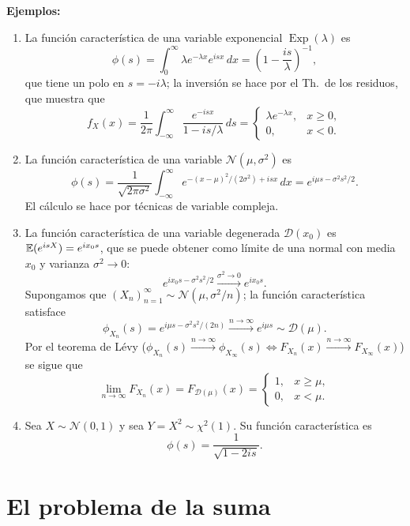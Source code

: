 \noindent \textbf{Ejemplos:}
\begin{enumerate}
  \item La función característica de una variable exponencial $\operatorname{Exp}(\lambda)$ es
        \[
          \phi(s) = \int_0^\infty \lambda e^{-\lambda x} e^{isx}\,dx = \left(1 - \frac{is}{\lambda}\right)^{-1},
        \]
        que tiene un polo en $s = -i\lambda$; la inversión se hace por el Th.\ de los residuos, que muestra que
        \[
          f_X(x) = \frac{1}{2\pi}\int_{-\infty}^\infty \frac{e^{-isx}}{1 - is/\lambda}\,ds =
          \begin{cases}
            \lambda e^{-\lambda x}, & x \ge 0, \\
            0, & x < 0.
          \end{cases}
        \]
  \item La función característica de una variable $\mathcal{N}(\mu, \sigma^2)$ es
        \[
          \phi(s) = \frac{1}{\sqrt{2\pi\sigma^2}}\int_{-\infty}^\infty e^{-(x-\mu)^2/(2\sigma^2) + isx}\,dx = e^{i\mu s - \sigma^2 s^2/2}.
        \]
        El cálculo se hace por técnicas de variable compleja.
  \item La función característica de una variable degenerada $\mathcal{D}(x_0)$ es $\mathbb{E}(e^{isX}) = e^{ix_0 s}$, que se puede obtener como límite de una normal con media $x_0$ y varianza $\sigma^2 \to 0$:
        \[
          e^{ix_0 s - \sigma^2 s^2/2} \xrightarrow{\sigma^2 \to 0} e^{ix_0 s}.
        \]
        Supongamos que $(X_n)_{n=1}^\infty \sim \mathcal{N}(\mu, \sigma^2/n)$; la función característica satisface
        \[
          \phi_{X_n}(s) = e^{i\mu s - \sigma^2 s^2/(2n)} \xrightarrow{n \to \infty} e^{i\mu s} \sim \mathcal{D}(\mu).
        \]
        Por el teorema de Lévy ($\phi_{X_n}(s) \xrightarrow{n \to \infty} \phi_{X_\infty}(s) \iff F_{X_n}(x) \xrightarrow{n \to \infty} F_{X_\infty}(x)$) se sigue que
        \[
          \lim_{n \to \infty} F_{X_n}(x) = F_{\mathcal{D}(\mu)}(x) =
          \begin{cases}
            1, & x \ge \mu, \\
            0, & x < \mu.
          \end{cases}
        \]
  \item Sea $X \sim \mathcal{N}(0,1)$ y sea $Y = X^2 \sim \chi^2(1)$. Su función característica es
        \[
          \phi(s) = \frac{1}{\sqrt{1 - 2is}}.
        \]
\end{enumerate}

\section{El problema de la suma}

